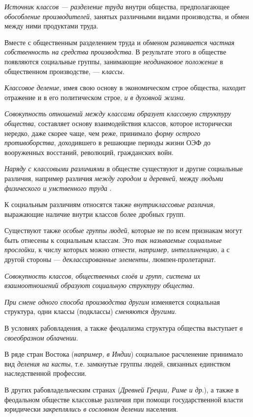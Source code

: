 \documentclass[a4paper,14pt,russian]{extreport}
\begin{document}
\emph{Источник классов --- разделение труда} внутри общества, предполагающее \emph{обособление производителей}, занятых различными видами производства, и обмен между ними продуктами труда.

Вместе с общественным разделением труда и обменом \emph{развивается частная собственность на средства производства}. В результате этого в обществе появляются социальные группы, занимающие \emph{неодинаковое положение} в общественном производстве, --- \emph{классы}.

\emph{Классовое деление}, имея свою основу в экономическом строе общества, находит отражение и в его политическом строе, \emph{и в духовной жизни}.

\emph{Совокупность отношений между классами образует классовую структуру общества}, составляет основу взаимодействия классов, которое исторически нередко, даже скорее чаще, чем реже, принимало \emph{форму острого противоборства}, доходившего в решающие периоды жизни ОЭФ до вооруженных восстаний, революций, гражданских войн.

\emph{Наряду с классовыми различиями} в обществе существуют и другие социальные различия, например различия \emph{между городом и деревней}, между \emph{людьми физического и умственного труда} .

К социальным различиям относятся также \emph{внутриклассовые различия}, выражающие наличие внутри классов более дробных групп.

Существуют также \emph{особые группы людей}, которые не по всем признакам могут быть отнесены к социальным классам. Это \emph{так называемые социальные прослойки}, к числу которых можно отнести, \emph{например, интеллиненцию}, а с другой стороны --- \emph{деклассированные элементы}, люмпен-пролетариат.

\emph{Совокупность классов, общественных слоёв и групп, система их взаимоотношений образуют социальную структуру общества}.

\emph{При смене одного способа производства другим} изменяется социальная структура, одни классы (подклассы) \emph{сменяются другими}.

В условиях рабовладения, а также феодализма структура общества выступает \emph{в своеобразном облачении}.

В ряде стран Востока (\emph{например, в Индии}) социальное расчленение принимало вид \emph{деления на касты}, т.е. замкнутые группы людей, связанных единством наследственной профессии.

В других рабовладельческим странах (\emph{Древней Греции, Риме и др}.), а также в феодальном обществе классовые различия при помощи государственной власти юридически \emph{закреплялись в сословном делении} населения.
\end{document}
